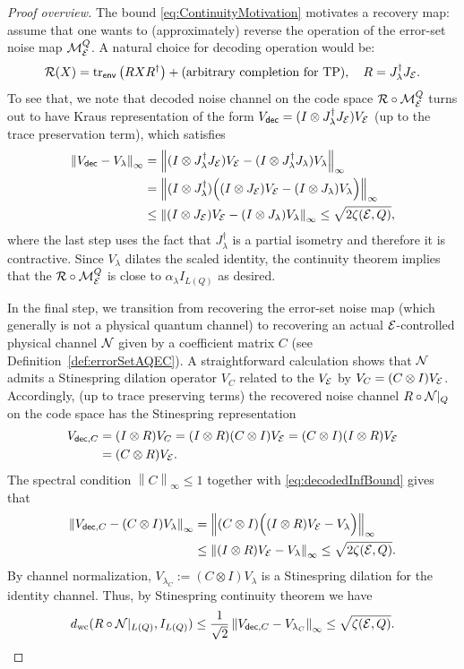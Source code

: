 \documentclass[10pt]{article}
\newcommand{\tr}{\mathrm{tr}}
\newcommand{\p}[1]{\left(#1\right)}
\newcommand{\norm}[1]{\left\|#1\right\|}
\newcommand{\s}[1]{\mathsf{#1}}
\begin{document}
\begin{proof}[Proof overview]
The bound \eqref{eq:ContinuityMotivation} motivates a recovery map: assume that one wants to (approximately) reverse the operation of the error-set noise map ${\cal M}_{{\cal E}}^Q$. A natural choice for decoding operation would be:
\[\calR(X)=\tr_{\s{env}}\p{R X R^\dag}+(\text{arbitrary completion for TP}), \quad R=J_\lambda^\dag  J_{\calE}.\]
To see that, we note that decoded noise channel on the code space ${\cal R}\circ {\cal M}_{{\cal E}}^Q$  turns out to have Kraus representation of the form $V_{\s{dec}}=(I\otimes J_{\lambda}^\dag J_{\calE})V_{\calE}$ (up to the trace preservation term), which satisfies 
\begin{align}
    \norm{V_{\s{dec}}-V_{\lambda}}_{\infty}&=\nonumber\norm{(I\otimes J_{\lambda}^\dag J_{\calE})V_{\calE}-(I\otimes J_{\lambda}^\dag J_{\lambda})V_{\lambda}}_{\infty}\\
    &\nonumber=\norm{(I\otimes J_{\lambda}^\dag)\Big((I\otimes  J_{\calE})V_{\calE}-(I\otimes  J_{\lambda})V_{\lambda}\Big)}_{\infty}\\
    &\leq\norm{(I\otimes  J_{\calE})V_{\calE}-(I\otimes  J_{\lambda})V_{\lambda}}_{\infty}\leq \sqrt{2\zeta  (\calE,Q)},\label{eq:decodedInfBound}
\end{align}
where the last step uses the fact that $J_{\lambda}^\dag$ is a partial isometry and therefore it is contractive. 
Since $V_{\lambda}$ dilates the scaled identity, 
the continuity theorem implies that the ${\cal R}\circ {\cal M}_{{\cal E}}^Q$ is close to $\alpha_{\lambda}I_{L(Q)}$ as desired. 

In the final step, we transition from recovering the error-set noise map (which generally is not a physical quantum channel) to recovering an actual ${\cal E}$-controlled physical channel ${\cal N}$ given by a coefficient matrix $C$ (see Definition~\ref{def:errorSetAQEC}). A straightforward calculation shows that ${\cal N}$ admits a Stinespring dilation operator $V_{C}$ related to the $V_{{\cal E}}$ by $V_{C}=(C\otimes I)V_{{\cal E}}$. Accordingly, (up to trace preserving terms) the recovered noise channel $R\circ{\cal N}|_Q$ on the code space has the Stinespring representation 
       \begin{align*}
       V_{\s{dec},C}&=(I\otimes R)V_C=(I\otimes R)(C\otimes I)V_{\calE}=(C\otimes I)(I\otimes R)V_{\calE}\\
       &= (C\otimes R)V_\calE.
       \end{align*}
The spectral condition $\norm{C}_{\infty}\leq 1$  together with \eqref{eq:decodedInfBound} gives that  
    \begin{align*}
    \norm{V_{\s{dec},C}-(C\otimes I)V_{\lambda}}_{\infty}&=\norm{(C\otimes I)\Big(  (I\otimes R)V_{\calE}-V_{\lambda}\Big)}_\infty\\
    &\leq\norm{  (I\otimes R)V_{\calE}-V_{\lambda}}_\infty\leq \sqrt{2\zeta(\calE,Q)}. 
    \end{align*}
 By channel normalization, $V_{\lambda_C}:=(C\otimes I)V_{\lambda}$ is a Stinespring dilation for the identity channel. Thus, by Stinespring continuity theorem we have 
     \[ d_{\mathrm{wc}}(R\circ\calN|_{L(Q)},I_{L(Q)})\leq \frac{1}{\sqrt{2}}\norm{V_{\s{dec},C}-V_{\lambda_C}}_{\infty}\leq \sqrt{\zeta(\calE,Q)}. \qedhere
     \]
\end{proof}
\end{document}
